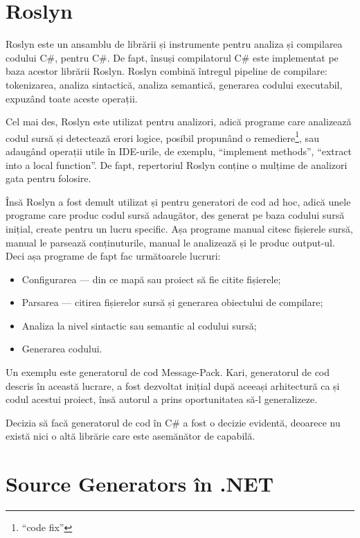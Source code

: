 \documentclass[a4paper,12pt]{report}
\begin{document}
\section{Roslyn}


Roslyn este un ansamblu de librării și instrumente pentru analiza și compilarea codului C\#, pentru C\#.
De fapt, însuși compilatorul C\# este implementat pe baza acestor librării Roslyn.
Roslyn combină întregul pipeline de compilare: tokenizarea, analiza sintactică, analiza semantică, generarea codului executabil, expuzând toate aceste operații.

Cel mai des, Roslyn este utilizat pentru analizori, adică programe care analizează codul sursă și detectează erori logice, posibil propunând o remediere\footnote{``code fix''}, sau adaugând operații utile în IDE-urile, de exemplu, ``implement methods'', ``extract into a local function''.
De fapt, repertoriul Roslyn conține o mulțime de analizori gata pentru folosire.

Însă Roslyn a fost demult utilizat și pentru generatori de cod ad hoc, adică unele programe care produc codul sursă adaugător, des generat pe baza codului sursă inițial, create pentru un lucru specific.
Așa programe manual citesc fișierele sursă, manual le parsează conținuturile, manual le analizează și le produc output-ul.
Deci așa programe de fapt fac următoarele lucruri:

\begin{itemize}
  \item Configurarea --- din ce mapă sau proiect să fie citite fișierele;
  \item Parsarea --- citirea fișierelor sursă și generarea obiectului de compilare;
  \item Analiza la nivel sintactic sau semantic al codului sursă;
  \item Generarea codului.
\end{itemize}

Un exemplu este generatorul de cod Message-Pack\cite{message_pack_github}.
Kari, generatorul de cod descris în această lucrare, a fost dezvoltat inițial după aceeași arhitectură ca și codul acestui proiect, însă autorul a prins oportunitatea să-l generalizeze.

Decizia să facă generatorul de cod în C\# a fost o decizie evidentă, deoarece nu există nici o altă librărie care este asemănător de capabilă.

\section{Source Generators în {{.}NET}}
\end{document}
